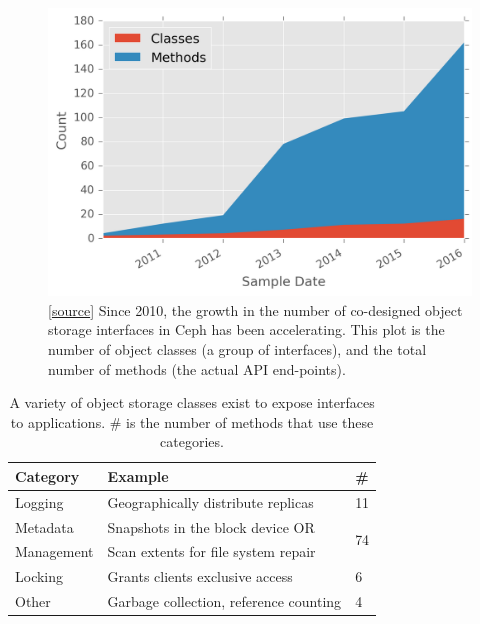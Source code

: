 \documentclass[preprint]{sigplanconf-eurosys}
\begin{document}
\begin{figure}[ht]
\centering
\includegraphics{figures/obj-int-dev-growth.png}
\caption{[\href{https://github.com/double-blind-submitter/osdi16}{source}]
Since 2010, the growth in the number of co-designed object storage interfaces
in Ceph has been accelerating. This plot is the number of object classes (a
group of interfaces), and the total number of methods (the actual API
end-points).}
\label{fig:obj-int-dev-growth}
\end{figure}

\begin{table}[ht]
\centering
  \begin{tabular}{l|l|l}
    Category & Example & \# \\ \hline
    Logging  & Geographically distribute replicas & 11 \\ \hdashline
    Metadata & Snapshots in the block device OR  & \multirow{2}{*}{74} \\
    Management & Scan extents for file system repair & \\ \hdashline
    Locking  & Grants clients exclusive access & 6 \\ \hdashline
    Other & Garbage collection, reference counting  & 4\\
\end{tabular}
\caption{A variety of object storage classes exist to expose interfaces
    to applications. \# is the number of methods that use these categories.
}
\label{table:objclasses}
\end{table}
\end{document}
